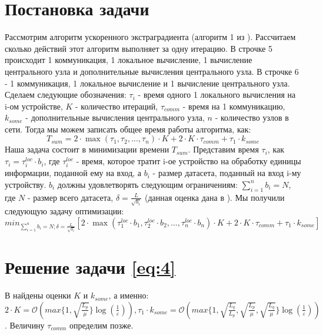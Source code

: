 \documentclass{article}
\begin{document}
\section{Постановка задачи}

Рассмотрим алгоритм ускоренного экстраградиента (алгоритм 1 из \cite{kovalev2022optimal}). Рассчитаем сколько действий этот алгоритм выполняет за одну итерацию. В строчке 5 происходит 1 коммуникация, 1 локальное вычисление, 1 вычисление центрального узла и дополнительные вычисления центрального узла. В строчке 6 - 1 коммуникация, 1 локальное вычисление и 1 вычисление центрального узла. Сделаем следующие обозначения: $\tau_i$ - время одного 1 локального вычисления на i-ом устройстве, $K$ - количество итераций, $\tau_{comm}$ - время на 1 коммуникацию, $k_{some}$ - дополнительные вычисления центрального узла, $n$ - количество узлов в сети. Тогда мы можем записать общее время работы алгоритма, как:
\begin{equation}
    \label{eq:3}
    T_{sum} = 2\cdot\max(\tau_1, \tau_2, ..., \tau_n)\cdot K + 2\cdot K\cdot\tau_{comm} + \tau_1\cdot k_{some}
\end{equation}
Наша задача состоит в минимизации времени $T_{sum}$. Представим время $\tau_i$, как $\tau_i = \tau_i^{loc}\cdot b_i$, где $\tau_i^{loc}$ - время, которое тратит i-ое устройство на обработку единицы информации, поданной ему на вход, а $b_i$ - размер датасета, поданный на вход i-му устройству. $b_i$ должны удовлетворять следующим ограничениям: $\sum\limits_{i = 1}^{n} b_i = N$, где $N$ - размер всего датасета, $\delta = \frac{L}{\sqrt{b_i}}$ (данная оценка дана в \cite{kovalev2022optimal}).
Мы получили следующую задачу оптимизации:
\begin{equation}
    \label{eq:4}
    min_{\sum\limits_{i = 1}^{n} b_i = N; \delta = \frac{L}{\sqrt{b_i}}}[ 2\cdot\max(\tau_1^{loc}\cdot b_1, \tau_2^{loc}\cdot b_2, ..., \tau_n^{loc}\cdot b_n)\cdot K + 2\cdot K\cdot\tau_{comm} + \tau_1\cdot k_{some}]
\end{equation}

\section{Решение задачи \ref{eq:4}}

В \cite{kovalev2022optimal} найдены оценки $K$ и $k_{some}$, а именно:\\ $2\cdot K = \mathcal O(max\{1, \sqrt{\frac{L_p}{\mu}}\}\log(\frac{1}{\varepsilon})), \tau_1\cdot k_{some} = \mathcal O(max\{1,\sqrt{\frac{L_q}{L_p}}, \sqrt{\frac{L_p}{\mu}}, \sqrt{\frac{L_q}{\mu}}\}\log(\frac{1}{\varepsilon}))$. Величину $\tau_{comm}$ определим позже. 
\end{document}
